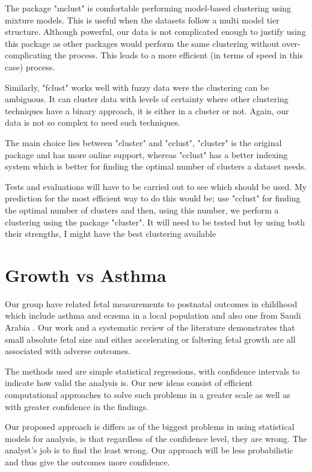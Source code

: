 \documentclass[bsc]{abdnthesis}
\begin{document}
The package "mclust" is comfortable performing model-based clustering using mixture models. This is useful when the datasets follow a multi model tier structure. Although powerful, our data is not complicated enough to justify using this package as other packages would perform the same clustering without over-complicating the process. This leads to a more efficient (in terms of speed in this case) process. 

Similarly, "fclust" works well with fuzzy data were the clustering can be ambiguous. It can cluster data with levels of certainty where other clustering techniques have a binary approach, it is either in a cluster or not. Again, our data is not so complex to need such techniques. 

The main choice lies between "cluster" and "cclust", "cluster" is the original package and has more online support, whereas "cclust" has a better indexing system which is better for finding the optimal number of clusters a dataset needs. 

Tests and evaluations will have to be carried out to see which should be used. My prediction for the most efficient way to do this would be; use "cclust" for finding the optimal number of clusters and then, using this number, we perform a clustering using the package "cluster". It will need to be tested but by using both their strengths, I might have the best clustering available
\section{Growth vs Asthma} %
\label{sec:growth_vs_asthma}
Our group  have related fetal measurements to postnatal outcomes in childhood which include asthma and eczema in a local population \cite{turner1, turner2, turner3} and also one from Saudi Arabia \cite{ saudi}.  Our work and a systematic review of the literature demonstrates that small absolute fetal size and either accelerating or faltering fetal growth are all associated with adverse outcomes. 

The methods used are simple statistical regressions, with confidence intervals to indicate how valid the analysis is. Our new ideas consist of efficient computational approaches to solve such problems in a greater scale as well as with greater confidence in the findings.

Our proposed approach is differs as of the biggest problems in using statistical models for analysis, is that regardless of the confidence level, they are wrong. The analyst's job is to find the least wrong. Our approach will be less probabilistic and thus give the outcomes more confidence. 
\end{document}
